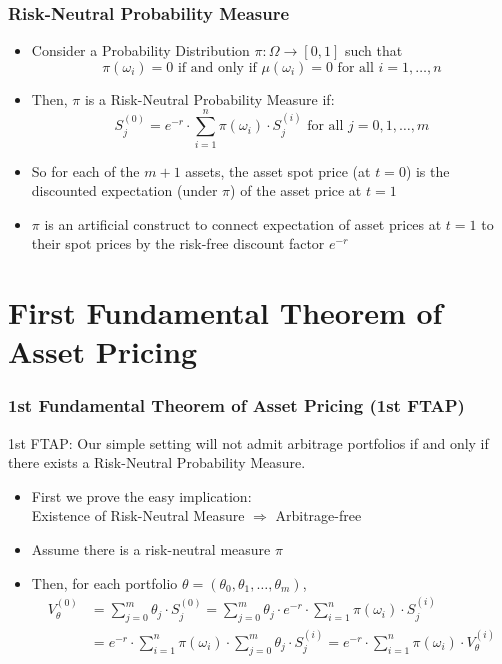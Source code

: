 \documentclass{beamer}
\begin{document}
\begin{frame}
\frametitle{Risk-Neutral Probability Measure}
\begin{itemize}
\item Consider a Probability Distribution $\pi : \Omega \rightarrow [0,1]$ such that 
$$\pi(\omega_i) = 0 \mbox{ if and only if } \mu(\omega_i) = 0 \mbox{ for all } i = 1, \ldots, n$$
\item Then, $\pi$ is a Risk-Neutral Probability Measure if:
\begin{equation}
S_j^{(0)} = e^{-r} \cdot \sum_{i=1}^n \pi(\omega_i) \cdot S_j^{(i)} \mbox{ for all } j = 0, 1, \ldots, m \label{eq:assetdiscexp}
\end{equation}
\item So for each of the $m+1$ assets, the asset spot price (at $t=0$) is the discounted expectation (under $\pi$) of the asset price at $t=1$
\item $\pi$ is an artificial construct to connect expectation of asset prices at $t=1$ to their spot prices by the risk-free discount factor $e^{-r}$
\end{itemize}
\end{frame}

\section{First Fundamental Theorem of Asset Pricing}
\begin{frame}
\frametitle{1st Fundamental Theorem of Asset Pricing (1st FTAP)}
\begin{theorem}
1st FTAP: Our simple setting will not admit arbitrage portfolios if and only if there exists a Risk-Neutral Probability Measure.
\end{theorem}
\begin{itemize}
\item First we prove the easy implication: \\Existence of Risk-Neutral Measure $\Rightarrow$ Arbitrage-free
\item Assume there is a risk-neutral measure $\pi$
\item Then, for each portfolio $\theta = (\theta_0, \theta_1, \ldots, \theta_m)$,
\begin{align*}
V_{\theta}^{(0)} & = \sum_{j=0}^m \theta_j \cdot S_j^{(0)} = \sum_{j=0}^m \theta_j \cdot e^{-r} \cdot \sum_{i=1}^n \pi(\omega_i) \cdot S_j^{(i)} \\
& = e^{-r} \cdot \sum_{i=1}^n \pi(\omega_i) \cdot \sum_{j=0}^m \theta_j \cdot S_j^{(i)} = e^{-r} \cdot \sum_{i=1}^n \pi(\omega_i) \cdot V_{\theta}^{(i)}
\end{align*}
\end{itemize}
\end{frame}
\end{document}
